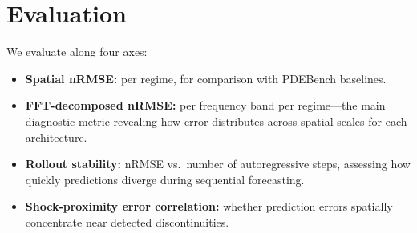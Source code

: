 \documentclass{article}
\begin{document}
\section*{Evaluation}

We evaluate along four axes:

\begin{itemize}
    \item \textbf{Spatial nRMSE:} per regime, for comparison with PDEBench baselines.
    \item \textbf{FFT-decomposed nRMSE:} per frequency band per regime---the main diagnostic metric revealing how error distributes across spatial scales for each architecture.
    \item \textbf{Rollout stability:} nRMSE vs.\ number of autoregressive steps, assessing how quickly predictions diverge during sequential forecasting.
    \item \textbf{Shock-proximity error correlation:} whether prediction errors spatially concentrate near detected discontinuities.
\end{itemize}



\end{document}
